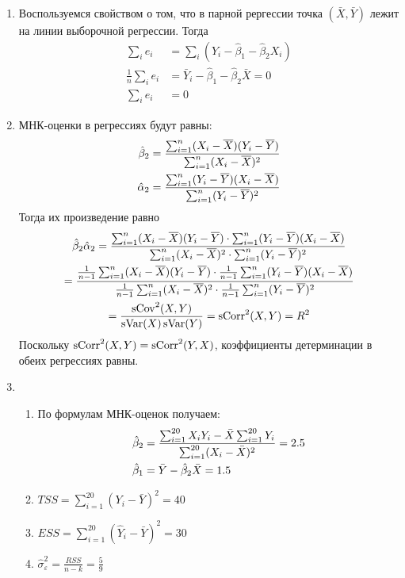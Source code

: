 \begin{enumerate}
\item Воспользуемся свойством о том, что в парной рергессии точка $(\bar X, \bar Y)$
лежит на линии выборочной регрессии. Тогда
\begin{align*}
\sum_i e_i &= \sum_i (Y_i - \hat \beta_1 - \hat \beta_2 X_i) \\
\frac{1}{n} \sum_i e_i &= \bar Y_i -  \hat \beta_1 - \hat \beta_2 \bar X = 0 \\
\sum_i e_i &= 0
\end{align*}

\item МНК-оценки в регрессиях будут равны:
\begin{align*}
\hat{\beta}_2 = \frac{\sum_{i=1}^n (X_i - \overline X)(Y_i - \overline Y)}{\sum_{i=1}^n (X_i - \overline X)^2} \\
\hat\alpha_2 = \frac{\sum_{i=1}^n (Y_i - \overline Y)(X_i - \overline X)}{\sum_{i=1}^n (Y_i - \overline Y)^2}
\end{align*}
Тогда их произведение равно
\begin{multline*}
\hat{\beta}_2 \hat\alpha_2 = \frac{\sum_{i=1}^n (X_i - \overline X)(Y_i - \overline Y) \cdot \sum_{i=1}^n (Y_i - \overline Y)(X_i - \overline X)}{\sum_{i=1}^n (X_i - \overline X)^2 \cdot \sum_{i=1}^n (Y_i - \overline Y)^2} \\
= \frac{\frac{1}{n-1} \sum_{i=1}^n (X_i - \overline X)(Y_i - \overline Y) \cdot \frac{1}{n-1}  \sum_{i=1}^n (Y_i - \overline Y)(X_i - \overline X)}{\frac{1}{n-1} \sum_{i=1}^n (X_i - \overline X)^2 \cdot \frac{1}{n-1} \sum_{i=1}^n (Y_i - \overline Y)^2} \\
= \frac{\operatorname{sCov}^2(X,Y)}{\operatorname{sVar}(X)\operatorname{sVar}(Y)} = \operatorname{sCorr}^2(X,Y) = R^2
\end{multline*}
Поскольку $\operatorname{sCorr}^2(X,Y) = \operatorname{sCorr}^2(Y,X)$, коэффициенты детерминации в обеих регрессиях равны.

\item
\begin{enumerate}
  \item По формулам МНК-оценок получаем:
  \begin{align*}
  &\hat{\beta}_2 = \frac{\sum_{i=1}^{20} X_i Y_i - \bar X \sum_{i=1}^{20} Y_i}{\sum_{i=1}^{20} (X_i - \bar X)^2} = 2.5 \\
  &\hat{\beta}_1 = \bar Y - \hat{\beta}_2 \bar X = 1.5
  \end{align*}
  \item $TSS = \sum_{i=1}^{20} (Y_i - \bar Y)^2 = 40$
  \item $ESS = \sum_{i=1}^{20} (\hat Y_i - \bar Y)^2 = 30$
  \item $\hat\sigma^2_{\varepsilon} = \frac{RSS}{n-k} = \frac{5}{9}$
  \end{enumerate}


\end{enumerate}
